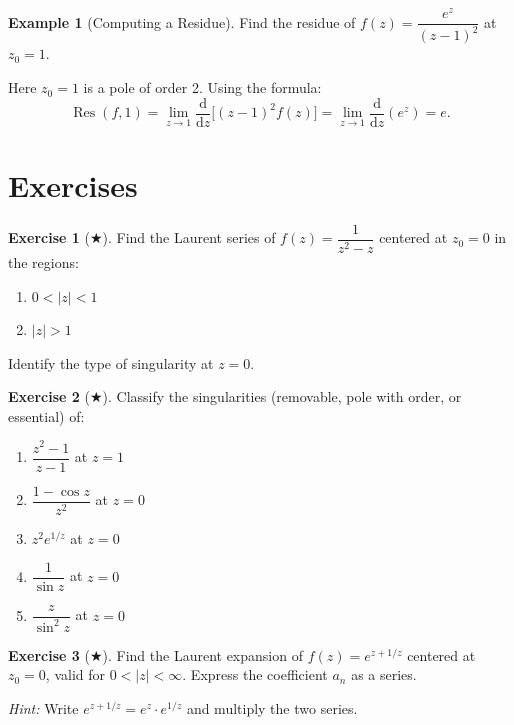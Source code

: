 \documentclass[12pt,a4paper,openany]{book}
\theoremstyle{definition}
\newtheorem{example}[definition]{Example}
\newtheorem{exercise}{Exercise}[chapter]
\theoremstyle{plain}
\theoremstyle{remark}
\DeclareMathOperator{\Res}{Res}
\newcommand{\dd}{\mathrm{d}}
\newcommand{\abs}[1]{\left|#1\right|}
\begin{document}
\begin{example}[Computing a Residue]\label{ex:residue-computation}
Find the residue of $f(z)=\dfrac{e^z}{(z-1)^2}$ at $z_0=1$.

Here $z_0=1$ is a pole of order 2. Using the formula:
\[
  \Res(f,1) = \lim_{z\to 1}\frac{\dd}{\dd z}\bigl[(z-1)^2 f(z)\bigr]
  = \lim_{z\to 1}\frac{\dd}{\dd z}(e^z) = e.
\]
\end{example}

\section{Exercises}
\label{sec:exercises-ch6}

\begin{exercise}[$\bigstar$]\label{exo:laurent-basic}
Find the Laurent series of $f(z)=\dfrac{1}{z^2-z}$ centered at $z_0=0$ in the
regions:
\begin{enumerate}[label=(\alph*)]
  \item $0<\abs{z}<1$
  \item $\abs{z}>1$
\end{enumerate}
Identify the type of singularity at $z=0$.
\end{exercise}

\begin{exercise}[$\bigstar$]\label{exo:classify-singularities}
Classify the singularities (removable, pole with order, or essential) of:
\begin{enumerate}[label=(\alph*)]
  \item $\dfrac{z^2-1}{z-1}$ at $z=1$
  \item $\dfrac{1-\cos z}{z^2}$ at $z=0$
  \item $z^2 e^{1/z}$ at $z=0$
  \item $\dfrac{1}{\sin z}$ at $z=0$
  \item $\dfrac{z}{\sin^2 z}$ at $z=0$
\end{enumerate}
\end{exercise}

\begin{exercise}[$\bigstar$]\label{exo:laurent-exp}
Find the Laurent expansion of $f(z)=e^{z+1/z}$ centered at $z_0=0$, valid for
$0<\abs{z}<\infty$. Express the coefficient $a_n$ as a series.

\textit{Hint:} Write $e^{z+1/z}=e^z\cdot e^{1/z}$ and multiply the two series.
\end{exercise}
\end{document}
